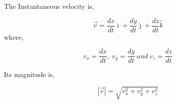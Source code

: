 \documentclass[]{beamer}
\begin{document}

\begin{frame}
The Instantaneous velocity is,

    \vspace{3mm}

         \begin{equation}
          \vec{v}=\frac{dx}{dt}\hat{\imath}+\frac{dy}{dt}\hat{\jmath}+\frac{dz}{dt}\hat{k}
         \end{equation}
   \vspace{3mm}
where,

   \begin{equation}
        v_x=\frac{dx}{dt},~ v_y=\frac{dy}{dt}~and~v_z=\frac{dz}{dt}
         \end{equation}

        \vspace{3mm}
Its magnitude is,


        \vspace{3mm}



         \begin{equation}
          |\vec{v}|=\sqrt{v^2_x+v^2_y+v^2_z}
         \end{equation}



\end{frame}


\end{document}
